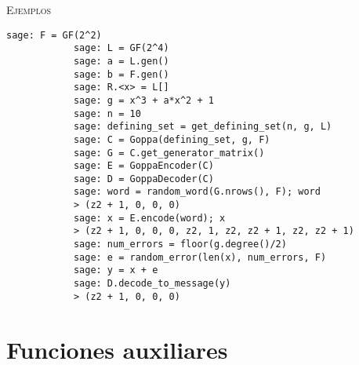\begin{description}[leftmargin=1em, font=\normalfont\ttfamily, style=nextline]
\begin{description}[font=\ttfamily, style=nextline]
        \textsc{Ejemplos}
        \begin{lstlisting}[gobble=4]
            sage: F = GF(2^2)
            sage: L = GF(2^4)
            sage: a = L.gen()
            sage: b = F.gen()
            sage: R.<x> = L[]
            sage: g = x^3 + a*x^2 + 1
            sage: n = 10
            sage: defining_set = get_defining_set(n, g, L)
            sage: C = Goppa(defining_set, g, F)
            sage: G = C.get_generator_matrix()
            sage: E = GoppaEncoder(C)
            sage: D = GoppaDecoder(C)
            sage: word = random_word(G.nrows(), F); word
            > (z2 + 1, 0, 0, 0)
            sage: x = E.encode(word); x
            > (z2 + 1, 0, 0, 0, z2, 1, z2, z2 + 1, z2, z2 + 1)
            sage: num_errors = floor(g.degree()/2)
            sage: e = random_error(len(x), num_errors, F)
            sage: y = x + e
            sage: D.decode_to_message(y)
            > (z2 + 1, 0, 0, 0)
        \end{lstlisting}
    \end{description}
\end{description}

\section{Funciones auxiliares}

